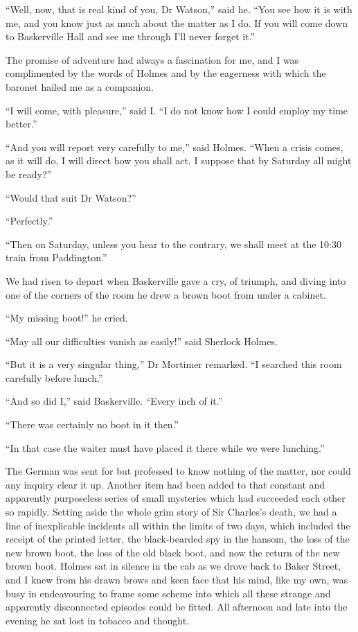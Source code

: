 \documentclass[paper=5.5in:8.5in,BCOR=7mm,twoside,DIV=calc,12pt,usegeometry,openany,chapterprefix,endperiod,headings=big]{scrbook} %
\begin{document}
\enquote{Well, now, that is real kind of you, Dr Watson,} said he. \enquote{You see how it is with me, and you know just as much about the matter as I do. If you will come down to Baskerville Hall and see me through I'll never forget it.}

The promise of adventure had always a fascination for me, and I was complimented by the words of Holmes and by the eagerness with which the baronet hailed me as a companion.

\enquote{I will come, with pleasure,} said I. \enquote{I do not know how I could employ my time better.}

\enquote{And you will report very carefully to me,} said Holmes. \enquote{When a crisis comes, as it will do, I will direct how you shall act. I suppose that by Saturday all might be ready?}

\enquote{Would that suit Dr Watson?}

\enquote{Perfectly.}

\enquote{Then on Saturday, unless you hear to the contrary, we shall meet at the 10:30 train from Paddington.}

We had risen to depart when Baskerville gave a cry, of triumph, and diving into one of the corners of the room he drew a brown boot from under a cabinet.

\enquote{My missing boot!} he cried.

\enquote{May all our difficulties vanish as easily!} said Sherlock Holmes.

\enquote{But it is a very singular thing,} Dr Mortimer remarked. \enquote{I searched this room carefully before lunch.}

\enquote{And so did I,} said Baskerville. \enquote{Every inch of it.}

\enquote{There was certainly no boot in it then.}

\enquote{In that case the waiter must have placed it there while we were lunching.}

The German was sent for but professed to know nothing of the matter, nor could any inquiry clear it up. Another item had been added to that constant and apparently purposeless series of small mysteries which had succeeded each other so rapidly. Setting aside the whole grim story of Sir Charles's death, we had a line of inexplicable incidents all within the limits of two days, which included the receipt of the printed letter, the black-bearded spy in the hansom, the loss of the new brown boot, the loss of the old black boot, and now the return of the new brown boot. Holmes sat in silence in the cab as we drove back to Baker Street, and I knew from his drawn brows and keen face that his mind, like my own, was busy in endeavouring to frame some scheme into which all these strange and apparently disconnected episodes could be fitted. All afternoon and late into the evening he sat lost in tobacco and thought.
\end{document}
